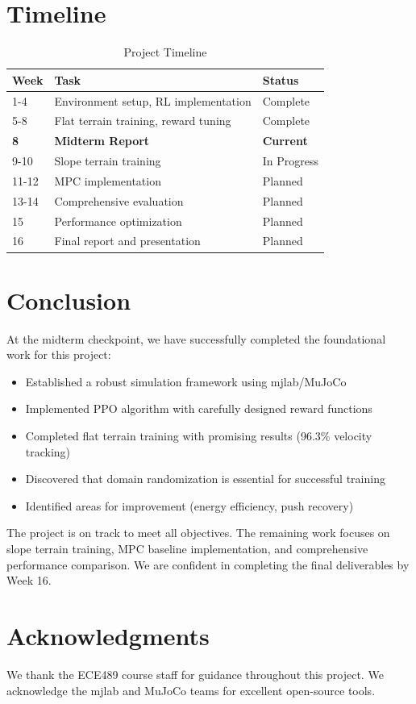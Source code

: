 \documentclass[12pt,a4paper]{article}
\begin{document}
\section{Timeline}

\begin{table}[h]
\centering
\caption{Project Timeline}
\begin{tabular}{|l|l|l|}
\hline
\textbf{Week} & \textbf{Task} & \textbf{Status} \\
\hline
1-4 & Environment setup, RL implementation & Complete \\
5-8 & Flat terrain training, reward tuning & Complete \\
\textbf{8} & \textbf{Midterm Report} & \textbf{Current} \\
9-10 & Slope terrain training & In Progress \\
11-12 & MPC implementation & Planned \\
13-14 & Comprehensive evaluation & Planned \\
15 & Performance optimization & Planned \\
16 & Final report and presentation & Planned \\
\hline
\end{tabular}
\end{table}

\section{Conclusion}

At the midterm checkpoint, we have successfully completed the foundational work for this project:
\begin{itemize}
    \item Established a robust simulation framework using mjlab/MuJoCo
    \item Implemented PPO algorithm with carefully designed reward functions
    \item Completed flat terrain training with promising results (96.3\% velocity tracking)
    \item Discovered that domain randomization is essential for successful training
    \item Identified areas for improvement (energy efficiency, push recovery)
\end{itemize}

The project is on track to meet all objectives. The remaining work focuses on slope terrain training, MPC baseline implementation, and comprehensive performance comparison. We are confident in completing the final deliverables by Week 16.

\section*{Acknowledgments}
We thank the ECE489 course staff for guidance throughout this project. We acknowledge the mjlab and MuJoCo teams for excellent open-source tools.
\end{document}
